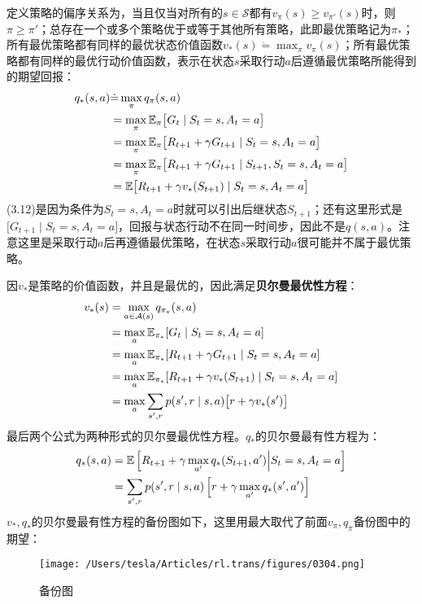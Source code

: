 \documentclass{ctexart}
\begin{document}
定义策略的偏序关系为，当且仅当对所有的$s\in\mathcal S$都有$v_\pi(s)\ge v_{\pi'}(s)$时，则$\pi\ge\pi'$；总存在一个或多个策略优于或等于其他所有策略，此即最优策略记为$\pi_*$；所有最优策略都有同样的最优状态价值函数$v_*(s)\dot=\max_\pi v_\pi(s)$；所有最优策略都有同样的最优行动价值函数，表示在状态$s$采取行动$a$后遵循最优策略所能得到的期望回报：
\begin{align}
    q_*(s,a) &\dot= \max_\pi q_\pi(s,a)\notag \\
             &= \max_\pi \mathbb E_\pi\bigl[ G_t \mid S_t=s, A_t=a \bigr]\notag \\
             &= \max_\pi\mathbb E_\pi\bigl[ R_{t+1} + \gamma G_{t+1} \mid S_t=s, A_t=a \bigr]\notag \\
             &= \max_\pi \mathbb E_\pi\bigl[ R_{t+1} + \gamma G_{t+1} \mid S_{t+1}, S_t=s,A_t=a \bigr] \\
             &= \mathbb E\bigl[ R_{t+1}+\gamma v_*(S_{t+1}) \mid S_t=s,A_t=a \bigr]
\end{align}
(3.12)是因为条件为$S_t=s,A_t=a$时就可以引出后继状态$S_{t+1}$；还有这里形式是$\mathbb[G_{t+1}\mid S_t=s,A_t=a]$，回报与状态行动不在同一时间步，因此不是$q(s,a)$。注意这里是采取行动$a$后再遵循最优策略，在状态$s$采取行动$a$很可能并不属于最优策略。

因$v_*$是策略的价值函数，并且是最优的，因此满足\textbf{贝尔曼最优性方程}：
\begin{align}
    v_*(s)
    &= \max_{a\in\mathcal A(s)} q_{\pi_*}(s,a)\notag \\
    &= \max_a \mathbb E_{\pi_*}[G_t \mid S_t=s, A_t=a]\notag \\
    &= \max_a \mathbb E_{\pi_*}[R_{t+1} + \gamma G_{t+1} \mid S_t=s, A_t=a] \\
    &= \max_a \mathbb E_{\pi_*}[R_{t+1} + \gamma v_*(S_{t+1}) \mid S_t=s, A_t=a] \\
    &= \max_a \sum_{s',r} p(s',r \mid s,a)\bigl[r+\gamma v_*(s')\bigr]
\end{align}
最后两个公式为两种形式的贝尔曼最优性方程。$q_*$的贝尔曼最有性方程为：
\begin{align}
    q_*(s,a)
    &= \mathbb E\left[ R_{t+1}+\gamma\max_{a'}q_*(S_{t+1}, a') \middle| S_t=s, A_t=a \right]\notag \\
    &= \sum_{s',r}p(s',r\mid s,a)\left[ r+\gamma\max_{a'}q_*(s',a') \right] 
\end{align}
$v_*,q_*$的贝尔曼最有性方程的备份图如下，这里用最大取代了前面$v_\pi,q_\pi$备份图中的期望：
\begin{figure}[htbp]
    \centering
    \texttt{[image: /Users/tesla/Articles/rl.trans/figures/0304.png]}
    \caption{备份图}
    \label{fig:0304} 
\end{figure}
\end{document}
